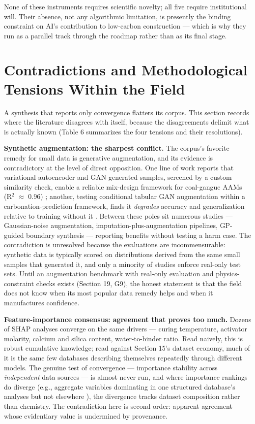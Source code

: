 \documentclass[pdflatex,sn-basic]{sn-jnl}
\begin{document}
None of these instruments requires scientific novelty; all five require institutional will. Their absence, not any algorithmic limitation, is presently the binding constraint on AI's contribution to low-carbon construction --- which is why they run as a parallel track through the roadmap rather than as its final stage.

\section{Contradictions and Methodological Tensions Within the Field}

A synthesis that reports only convergence flatters its corpus. This section records where the literature disagrees with itself, because the disagreements delimit what is actually known (Table 6 summarizes the four tensions and their resolutions).

\textbf{Synthetic augmentation: the sharpest conflict.} The corpus's favorite remedy for small data is generative augmentation, and its evidence is contradictory at the level of direct opposition. One line of work reports that variational-autoencoder and GAN-generated samples, screened by a custom similarity check, enable a reliable mix-design framework for coal-gangue AAMs (R$^2$ $\approx$ 0.96) \citep{gu2025}; another, testing conditional tabular GAN augmentation within a carbonation-prediction framework, finds it \emph{degrades} accuracy and generalization relative to training without it \citep{liu2025}. Between these poles sit numerous studies --- Gaussian-noise augmentation, imputation-plus-augmentation pipelines, GP-guided boundary synthesis --- reporting benefits without testing a harm case. The contradiction is unresolved because the evaluations are incommensurable: synthetic data is typically scored on distributions derived from the same small samples that generated it, and only a minority of studies enforce real-only test sets. Until an augmentation benchmark with real-only evaluation and physics-constraint checks exists (Section 19, G9), the honest statement is that the field does not know when its most popular data remedy helps and when it manufactures confidence.

\textbf{Feature-importance consensus: agreement that proves too much.} Dozens of SHAP analyses converge on the same drivers --- curing temperature, activator molarity, calcium and silica content, water-to-binder ratio. Read naively, this is robust cumulative knowledge; read against Section 15's dataset economy, much of it is the same few databases describing themselves repeatedly through different models. The genuine test of convergence --- importance stability across \emph{independent} data sources --- is almost never run, and where importance rankings do diverge (e.g., aggregate variables dominating in one structured database's analyses but not elsewhere \citep{jagad2026}), the divergence tracks dataset composition rather than chemistry. The contradiction here is second-order: apparent agreement whose evidentiary value is undermined by provenance.
\end{document}
